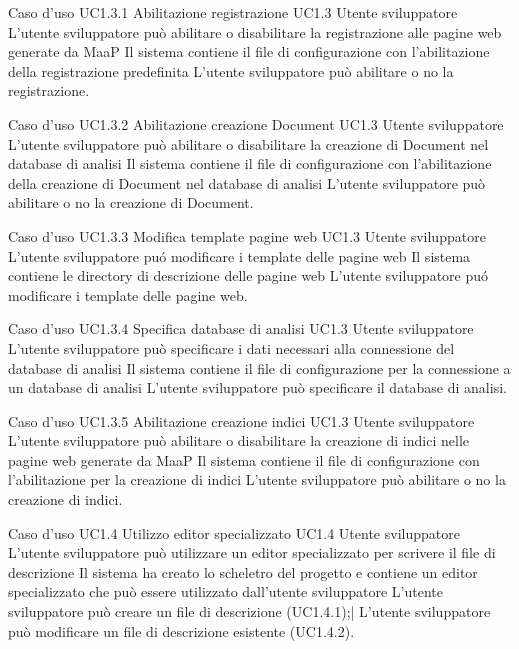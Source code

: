 \UCtitle
{Caso d'uso UC1.3.1}
{Abilitazione registrazione}
\UC
{UC1.3}
{Utente sviluppatore}
{L'utente sviluppatore può abilitare o disabilitare la registrazione alle pagine web generate da MaaP}
{Il sistema contiene il file di configurazione con l'abilitazione della registrazione predefinita}
\scenario
{L'utente sviluppatore può abilitare o no la registrazione.}

\UCtitle
{Caso d'uso UC1.3.2}
{Abilitazione creazione Document}
\UC
{UC1.3}
{Utente sviluppatore}
{L'utente sviluppatore può abilitare o disabilitare la creazione di Document nel database di analisi}
{Il sistema contiene il file di configurazione con l'abilitazione della creazione di Document nel database di analisi}
\scenario
{L'utente sviluppatore può abilitare o no la creazione di Document.}

\UCtitle
{Caso d'uso UC1.3.3}
{Modifica template pagine web}
\UC
{UC1.3}
{Utente sviluppatore}
{L'utente sviluppatore pu\'o modificare i template delle pagine web}
{Il sistema contiene le directory di descrizione delle pagine web}
\scenario
{L'utente sviluppatore pu\'o modificare i template delle pagine web.}

\UCtitle
{Caso d'uso UC1.3.4}
{Specifica database di analisi}
\UC
{UC1.3}
{Utente sviluppatore}
{L'utente sviluppatore può specificare i dati necessari alla connessione del database di analisi}
{Il sistema contiene il file di configurazione per la connessione a un database di analisi}
\scenario
{L'utente sviluppatore può specificare il database di analisi.}

\UCtitle
{Caso d'uso UC1.3.5}
{Abilitazione creazione indici}
\UC
{UC1.3}
{Utente sviluppatore}
{L'utente sviluppatore può abilitare o disabilitare la creazione di indici nelle pagine web generate da MaaP}
{Il sistema contiene il file di configurazione con l'abilitazione per la creazione di indici}
\scenario
{L'utente sviluppatore può abilitare o no la creazione di indici.}

\UCtitle
{Caso d'uso UC1.4}
{Utilizzo editor specializzato}
\UC
{UC1.4}
{Utente sviluppatore}
{L'utente sviluppatore può utilizzare un editor specializzato per scrivere il file di descrizione}
{Il sistema ha creato lo scheletro del progetto e contiene un editor specializzato che può essere utilizzato dall'utente sviluppatore}
\scenario
{L'utente sviluppatore può creare un file di descrizione (UC1.4.1);|
L'utente sviluppatore può modificare un file di descrizione esistente (UC1.4.2).
}

